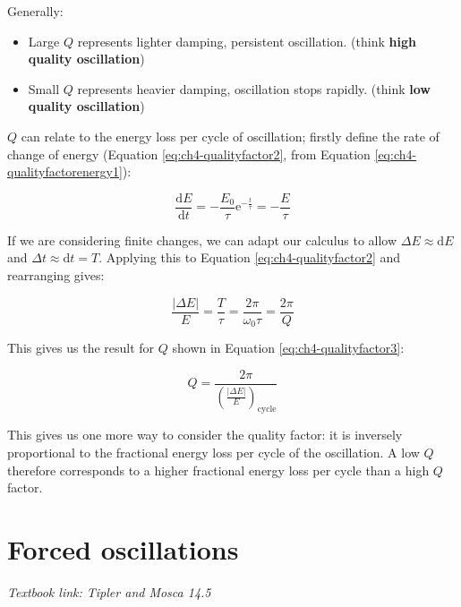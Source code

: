 \documentclass[
]{book}
\providecommand{\tightlist}{%
  \setlength{\itemsep}{0pt}\setlength{\parskip}{0pt}}
\begin{document}
Generally:

\begin{itemize}
\tightlist
\item
  Large \(Q\) represents lighter damping, persistent oscillation. (think \textbf{high quality oscillation})
\item
  Small \(Q\) represents heavier damping, oscillation stops rapidly. (think \textbf{low quality oscillation})
\end{itemize}

\(Q\) can relate to the energy loss per cycle of oscillation; firstly define the rate of change of energy (Equation \eqref{eq:ch4-qualityfactor2}, from Equation \eqref{eq:ch4-qualityfactorenergy1}):

\begin{equation}
\frac{\mathrm{d}E}{\mathrm{d} t} = -\frac{E_0}{\tau} \mathrm{e}^{-\frac{t}{\tau}} = -\frac{E}{\tau}
\label{eq:ch4-qualityfactor2}
\end{equation}

If we are considering finite changes, we can adapt our calculus to allow \(\Delta E \approx \mathrm{d}E\) and \(\Delta t \approx \mathrm{d}t = T\). Applying this to Equation \eqref{eq:ch4-qualityfactor2} and rearranging gives:

\begin{equation}
\frac{|\Delta E|}{E} = \frac{T}{\tau} = \frac{2 \pi}{\omega_0 \tau} = \frac{2 \pi}{Q}
\end{equation}

This gives us the result for \(Q\) shown in Equation \eqref{eq:ch4-qualityfactor3}:

\begin{equation}
Q = \frac{2 \pi}{\left( \frac{|\Delta E|}{E} \right)_{\mathrm{cycle}}}
\label{eq:ch4-qualityfactor3}
\end{equation}

This gives us one more way to consider the quality factor: it is inversely proportional to the fractional energy loss per cycle of the oscillation. A low \(Q\) therefore corresponds to a higher fractional energy loss per cycle than a high \(Q\) factor.

\hypertarget{sec-ch5-forcedoscillations}{%
\chapter{Forced oscillations}\label{sec-ch5-forcedoscillations}}

\emph{Textbook link: Tipler and Mosca 14.5}
\end{document}
